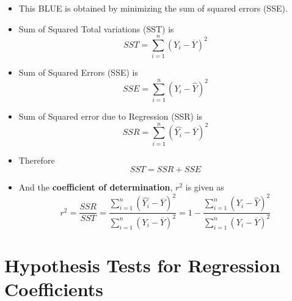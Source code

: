 \documentclass{article}
\theoremstyle{plain}
\theoremstyle{definition}
\begin{document}
\begin{itemize}
    \item This BLUE is obtained by minimizing the sum of squared errors (SSE). 
    
    \item Sum of Squared Total variations (SST) is
    \begin{equation*}
        SST = \sum_{i=1}^{n} (Y_i - \overline{Y})^2
    \end{equation*}
    
    \item Sum of Squared Errors (SSE) is 
    \begin{equation*}
        SSE = \sum_{i=1}^{n} (Y_i - \hat{Y})^2
    \end{equation*}
    
    \item Sum of Squared error due to Regression (SSR) is 
    \begin{equation}
        SSR = \sum_{i=1}^{n} (\hat{Y_i} - \overline{Y})^2
    \end{equation}
    
    \item Therefore
    \begin{equation*}
        SST = SSR + SSE
    \end{equation*}
    
    \item And the \textbf{coefficient of determination}, $r^2$ is given as
    \begin{equation}
        r^2 = \frac{SSR}{SST} = \frac{\sum\limits_{i=1}^{n} (\hat{Y_i} - \overline{Y})^2}{\sum\limits_{i=1}^{n} (Y_i - \overline{Y})^2} = 1 - \frac{\sum\limits_{i=1}^{n} (Y_i - \hat{Y})^2}{\sum\limits_{i=1}^{n} (Y_i - \overline{Y})^2}
    \end{equation}
\end{itemize}

\section{Hypothesis Tests for Regression Coefficients}
\end{document}
